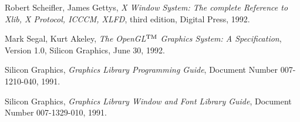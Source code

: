 \documentclass[titlepage,twoside]{article}
\begin{document}
\begin{thebibliography}{99}
Robert Scheifler, James Gettys, {\em X Window System: The complete Reference
to Xlib, X Protocol, ICCCM, XLFD}, third edition, Digital Press, 1992.

Mark Segal, Kurt Akeley, {\em The OpenGL${}^{\rm TM}$ Graphics System:
A Specification}, Version 1.0, Silicon Graphics, June 30, 1992.

Silicon Graphics, {\em Graphics Library Programming Guide},
Document Number 007-1210-040, 1991.

Silicon Graphics, {\em Graphics Library Window and Font Library Guide},
Document Number 007-1329-010, 1991.

\end{thebibliography}

\newpage


\end{document}
